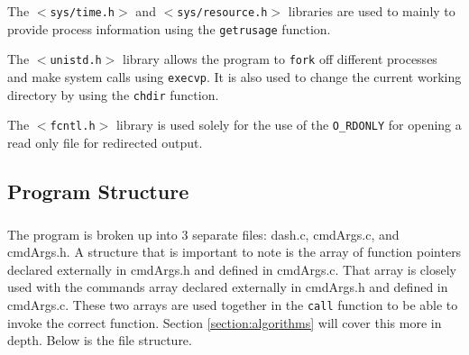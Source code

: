\documentclass[10pt]{article}
\begin{document}
The \texttt{$<$sys/time.h$>$} and \texttt{$<$sys/resource.h$>$} libraries are used to mainly to provide process information using the \texttt{getrusage} function.

The \texttt{$<$unistd.h$>$} library allows the program to \texttt{fork} off different processes and make system calls using \texttt{execvp}. It is also used to change the current working directory by using the \texttt{chdir} function.

The \texttt{$<$fcntl.h$>$} library is used solely for the use of the \texttt{O\_RDONLY} for opening a read only file for redirected output. 

\subsection{Program Structure}
\label{subsection:structure}
\subparagraph{}
The program is broken up into 3 separate files: dash.c, cmdArgs.c, and cmdArgs.h. A structure that is important to note is the array of function pointers declared externally in cmdArgs.h and defined in cmdArgs.c. That array is closely used with the commands array declared externally in cmdArgs.h and defined in cmdArgs.c. These two arrays are used together in the \texttt{call} function to be able to invoke the correct function. Section \ref{section:algorithms} will cover this more in depth. Below is the file structure.\\
\end{document}
